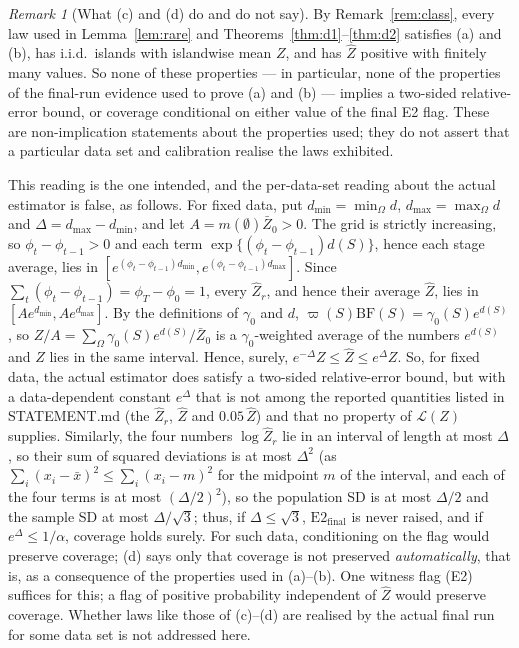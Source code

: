 \documentclass[11pt]{article}
\theoremstyle{remark}
\newtheorem{remark}[theorem]{Remark}
\newcommand{\Zh}{\widehat Z}
\newcommand{\cL}{\mathcal{L}}
\newcommand{\Etwo}{\mathrm{E2}_{\mathrm{final}}}
\begin{document}
\begin{remark}[What (c) and (d) do and do not say]
By Remark~\ref{rem:class}, every law used in Lemma~\ref{lem:rare} and Theorems~\ref{thm:d1}--\ref{thm:d2} satisfies (a) and
(b), has i.i.d.\ islands with islandwise mean $Z$, and has $\Zh$ positive with finitely many values. So none of these
properties --- in particular, none of the properties of the final-run evidence used to prove (a) and (b) --- implies a
two-sided relative-error bound, or coverage conditional on either value of the final E2 flag. These are non-implication
statements about the properties used; they do not assert that a particular data set and calibration realise the laws
exhibited.

This reading is the one intended, and the per-data-set reading about the actual estimator is false, as follows. For
fixed data, put $d_{\min}=\min_\Omega d$, $d_{\max}=\max_\Omega d$ and $\Delta=d_{\max}-d_{\min}$, and let
$A=m(\emptyset)\bar Z_0>0$. The grid is strictly increasing, so $\phi_t-\phi_{t-1}>0$ and each term
$\exp\{(\phi_t-\phi_{t-1})d(S)\}$, hence each stage average, lies in
$[e^{(\phi_t-\phi_{t-1})d_{\min}},e^{(\phi_t-\phi_{t-1})d_{\max}}]$. Since $\sum_t(\phi_t-\phi_{t-1})=\phi_T-\phi_0=1$, every
$\Zh_r$, and hence their average $\Zh$, lies in $[Ae^{d_{\min}},Ae^{d_{\max}}]$. By the definitions of $\gamma_0$ and $d$,
$\varpi(S)\mathrm{BF}(S)=\gamma_0(S)e^{d(S)}$, so $Z/A=\sum_\Omega\gamma_0(S)e^{d(S)}/\bar Z_0$ is a $\gamma_0$-weighted average
of the numbers $e^{d(S)}$ and $Z$ lies in the same interval. Hence, surely, $e^{-\Delta}Z\le\Zh\le e^{\Delta}Z$. So, for
fixed data, the actual estimator does satisfy a two-sided relative-error bound, but with a data-dependent constant
$e^{\Delta}$ that is not among the reported quantities listed in STATEMENT.md (the $\Zh_r$, $\Zh$ and $0.05\,\Zh$) and that
no property of $\cL(Z)$ supplies. Similarly, the four numbers $\log\Zh_r$ lie in an interval of length at most $\Delta$, so
their sum of squared deviations is at most $\Delta^2$ (as $\sum_i(x_i-\bar x)^2\le\sum_i(x_i-m)^2$ for the midpoint $m$ of
the interval, and each of the four terms is at most $(\Delta/2)^2$), so
the population SD is at most $\Delta/2$ and the sample SD at most $\Delta/\sqrt3$; thus, if $\Delta\le\sqrt3$, $\Etwo$ is
never raised, and if $e^{\Delta}\le1/\alpha$, coverage holds surely. For such data, conditioning on the flag would
preserve coverage; (d) says only that coverage is not preserved \emph{automatically}, that is, as a consequence of the
properties used in (a)--(b). One witness flag (E2) suffices for this; a flag of positive probability independent of
$\Zh$ would preserve coverage. Whether laws like those of (c)--(d) are realised by the actual final run for some data
set is not addressed here.
\end{remark}
\end{document}
